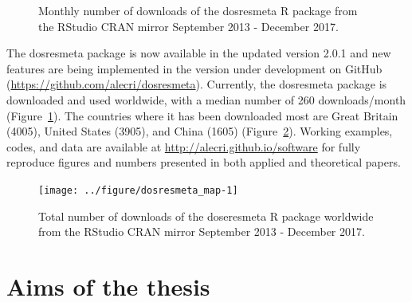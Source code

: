 \documentclass[11pt,a4paper,twoside,openany]{book}\usepackage{knitr}
\newcommand{\pkg}[1]{{\fontseries{b}\selectfont #1}}
\begin{document}
{\begin{knitrout}
\begin{figure}[ht!]
{}

\caption[Monthly number of downloads of the dosresmeta R package from the RStudio CRAN mirror September 2013 - December 2017]{Monthly number of downloads of the dosresmeta R package from the RStudio CRAN mirror September 2013 - December 2017.}\label{fig:dosresmeta_ts}
\end{figure}


\end{knitrout}

The \pkg{dosresmeta} package is now available in the updated version 2.0.1 and new features are being implemented in the version under development on GitHub (\url{https://github.com/alecri/dosresmeta}). Currently, the \pkg{dosresmeta} package is downloaded and used worldwide, with a median number of 260 downloads/month (Figure~\ref{fig:dosresmeta_ts}). The countries where it has been downloaded most are Great Britain (4005), United States (3905), and China (1605) (Figure~\ref{fig:dosresmeta_map}). Working examples, codes, and data are available at \url{http://alecri.github.io/software} for fully reproduce figures and numbers presented in both applied and theoretical papers.

\begin{knitrout}\footnotesize
{}\color{fgcolor}\begin{figure}[ht!]

{\centering \texttt{[image: ../figure/dosresmeta\_map-1]} 

}

\caption[Total number of downloads of the doseresmeta R package worldwide from the RStudio CRAN mirror September 2013 - December 2017]{Total number of downloads of the doseresmeta R package worldwide from the RStudio CRAN mirror September 2013 - December 2017.}\label{fig:dosresmeta_map}
\end{figure}


\end{knitrout}



%

\chapter{Aims of the thesis}

}
\end{document}
